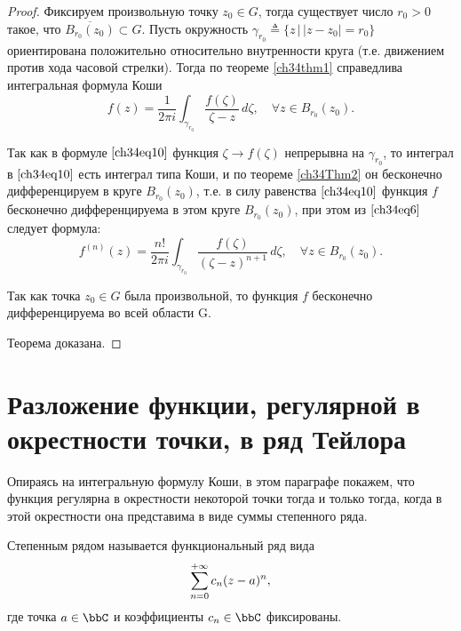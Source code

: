\begin{proof}
Фиксируем произвольную точку $z_0 \in G$, тогда существует число $r_0 > 0$ такое, что $\overline{B_{r_0}(z_0)}\subset G$. Пусть окружность $\gamma_{r_0} \triangleq \{ z \,\big|\, |z - z_0| = r_0 \}$ ориентирована положительно относительно внутренности круга (т.е. движением против хода часовой стрелки). Тогда по теореме \ref{ch34thm1} справедлива интегральная формула Коши
\begin{equation} \label{ch34eq10}
f(z) = \frac{1}{2\pi i} \int_{\gamma_{r_0}} \frac{f(\zeta)}{\zeta - z} \,d\zeta, \quad \forall z \in B_{r_0}(z_0).
\end{equation}

Так как в формуле $\eqref{ch34eq10}$ функция $\zeta \to f(\zeta)$ непрерывна на $\gamma_{r_0}$, то интеграл в $\eqref{ch34eq10}$ есть интеграл типа Коши, и по теореме \ref{ch34Thm2} он бесконечно дифференцируем в круге $B_{r_0}(z_0)$, т.е. в силу равенства $\eqref{ch34eq10}$ функция $f$ бесконечно дифференцируема в этом круге $B_{r_0}(z_0)$, при этом из $\eqref{ch34eq6}$ следует формула:
\begin{equation} \label{ch34eq11}
f^{(n)}(z) = \frac{n!}{2\pi i} \int_{\gamma_{r_0}} \frac{f(\zeta)}{(\zeta - z)^{n+1}}\,d\zeta, \quad \forall z \in B_{r_0}(z_0).
\end{equation}

Так как точка $z_0 \in G$ была произвольной, то функция $f$ бесконечно дифференцируема во всей области G.

Теорема доказана.
\end{proof}

\section{Разложение функции, регулярной в окрестности точки, в ряд Тейлора}

Опираясь на интегральную формулу Коши, в этом параграфе покажем, что функция регулярна в окрестности некоторой точки тогда и только тогда, когда в этой окрестности она представима в виде суммы степенного ряда.

\begin{defn}
$\textit{Степенным рядом}$ называется функциональный ряд вида
\begin{equation} \label{ch34.2eq1}
\sum_{n = 0}^{+\infty}\limits c_n (z - a)^n,
\end{equation}
где точка $a \in \bbC$ и коэффициенты $c_n \in \bbC$ фиксированы.
\end{defn}

